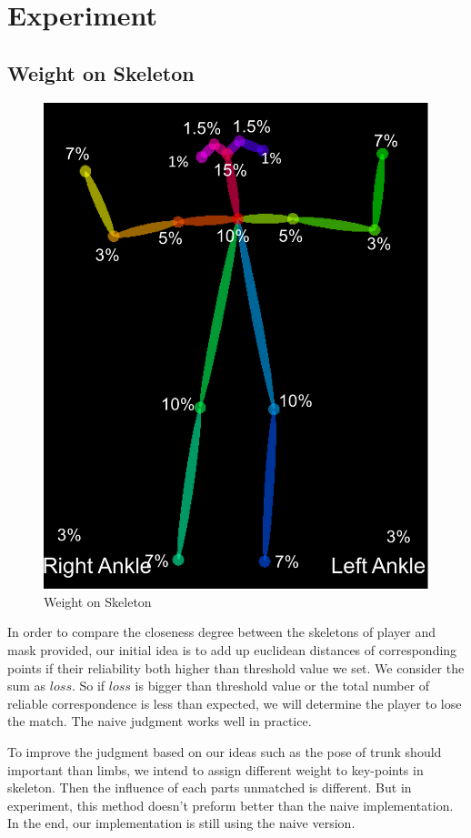\documentclass[11pt,twocolumn,letterpaper]{article}
\begin{document}
\section{Experiment}
	\subsection{Weight on Skeleton}
      \begin{figure}[h]
      \centering
      \includegraphics[width=0.8\linewidth]{./Pic/skeleton}
      \caption{Weight on Skeleton}
      \end{figure}

      \par In order to compare the closeness degree between the skeletons of player and mask provided, our initial idea is to add up euclidean distances of corresponding points if their reliability both higher than threshold value we set. We consider the sum as $loss$. So if $loss$ is bigger than threshold value or the total number of reliable correspondence is less than expected, we will determine the player to lose the match. The naive judgment works well in practice.
      \par To improve the judgment based on our ideas such as the pose of trunk should important than limbs, we intend to assign different weight to key-points in skeleton. Then the influence of each parts unmatched is different. But in experiment, this method doesn't preform better than the naive implementation. In the end, our implementation is still using the naive version.
\end{document}
